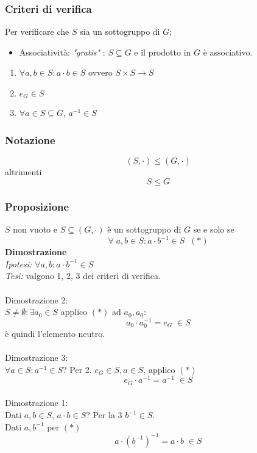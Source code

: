 \subsubsection{Criteri di verifica}
Per verificare che \(S\) sia un sottogruppo di \(G\);
\begin{itemize}
	\item Associatività: \textit{"gratis"} : \(S\subseteq G\) e il prodotto in \(G\) è associativo.
\end{itemize}

\begin{enumerate}

	\item \(\forall a,b \in S:a\cdot b\in S\) ovvero \(S\times S\rightarrow S\)

	\item \(e_G\in S\)

	\item \(\forall a\in S\subseteq G\),  \(a^{-1}\in S\)
\end{enumerate}

\subsubsection{Notazione}
\[(S,\cdot)\leq (G,\cdot )\]
altrimenti
\[S\leq G\]

\subsubsection{Proposizione}
\(S\) non vuoto e \(S\subseteq (G,\cdot)\) è un sottogruppo di \(G\) se e solo se
\[\forall\;a,b \in S: a\cdot b^{-1}\in S\;\;(*)\]
\textbf{Dimostrazione}
\\\textit{Ipotesi:} \(\forall a,b: a\cdot b^{-1}\in S\)
\\\textit{Tesi:} valgono 1, 2, 3 dei criteri di verifica.
\\\\
Dimostrazione 2:
\\
\(S\neq\emptyset :\exists a_0\in S\) applico \((*)\) ad \(a_0, a_0\):
\[a_0\cdot a_0^{-1}=e_G\;\in S\]
è quindi l'elemento neutro.
\\\\
Dimostrazione 3:
\\
\(\forall a\in S:a^{-1}\in S\)?
Per 2. \(e_G\in S, a\in S\), applico \((*)\)
\[e_G\cdot a^{-1}=a^{-1}\;\in S\]
\\
Dimostrazione 1:
\\
Dati \(a, b\in S\), \(a\cdot b\in S\)? Per la 3 \(b^{-1}\in S\).
\\
Dati \(a,b^{-1}\) per \((*)\)
\[a\cdot (b^{-1})^{-1}=a\cdot b\;\in S\]

